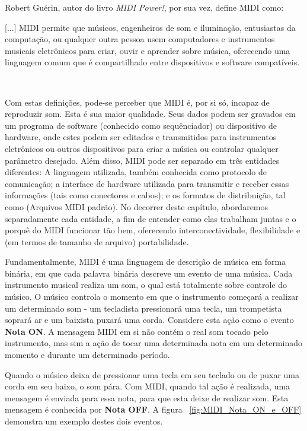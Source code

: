             Robert Guérin, autor do livro \textit{MIDI Power!}, por sua vez, define MIDI como: \epigraph{[...] MIDI permite que músicos, engenheiros de som e iluminação, entusiastas da computação, ou qualquer outra pessoa usem computadores e instrumentos musicais eletrônicos para criar, ouvir e aprender sobre música, oferecendo uma linguagem comum que é compartilhado entre dispositivos e software compatíveis.}{~\cite{Guerin}}

            Com estas definições, pode-se perceber que MIDI é, por si só, incapaz de reproduzir som. Esta é sua maior qualidade. Seus dados podem ser gravados em um programa de software (conhecido como sequênciador) ou dispositivo de hardware, onde estes podem ser editados e transmitidos para instrumentos eletrônicos ou outros dispositivos para criar a música ou controlar qualquer parâmetro desejado. Além disso, MIDI pode ser separado em três entidades diferentes: A linguagem utilizada, também conhecida como protocolo de comunicação; a interface de hardware utilizada para transmitir e receber essas informações (tais como conectores e cabos); e os formatos de distribuição, tal como  (Arquivos MIDI padrão). No decorrer deste capítulo, abordaremos separadamente cada entidade, a fim de entender como elas trabalham juntas e o porquê do MIDI funcionar tão bem, oferecendo interconectividade, flexibilidade e (em termos de tamanho de arquivo) portabilidade. 
            
            Fundamentalmente, MIDI é uma linguagem de descrição de música em forma binária, em que cada palavra binária descreve um evento de uma música. Cada instrumento musical realiza um som, o qual está totalmente sobre controle do músico. O músico controla o momento em que o instrumento começará a realizar um determinado som - um tecladista pressionará uma tecla, um trompetista soprará ar e um baixista puxará uma corda. Considere esta ação como o evento \textbf{Nota ON}. A mensagem MIDI em si não contém o real som tocado pelo instrumento, mas sim a ação de tocar uma determinada nota em um determinado momento e durante um determinado período.
            
            Quando o músico deixa de pressionar uma tecla em seu teclado ou de puxar uma corda em seu baixo, o som pára. Com MIDI, quando tal ação é realizada, uma mensagem é enviada para essa nota, para que esta deixe de realizar som. Esta mensagem é conhecida por \textbf{Nota OFF}. A figura ~\ref{fig:MIDI_Nota_ON_e_OFF} demonstra um exemplo destes dois eventos.
            
